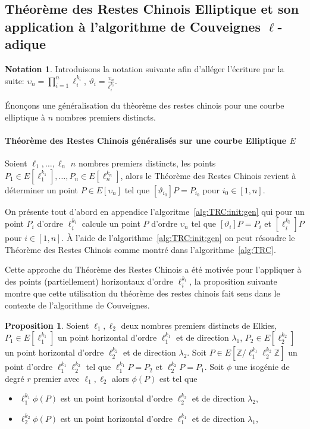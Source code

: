 \documentclass[10pt,a4paper]{book}
\theoremstyle{plain}
\theoremstyle{definition}
\theoremstyle{definition}
\theoremstyle{definition}
\newtheorem{prop}[thm]{Proposition}
\theoremstyle{definition}
\theoremstyle{remark}
\theoremstyle{remark}
\theoremstyle{definition}
\newtheorem{nota}[thm]{Notation}
\begin{document}
\subsection{Théorème des Restes Chinois Elliptique et son application à l'algorithme de Couveignes $\ell$-adique}
\label{sub:TRCE:cou}


\begin{nota}
Introduisons la notation suivante afin d'alléger l'écriture par la suite: 
$\upsilon_n=\prod_{i=1}^n \ell_i^{k_i}$, 
$\vartheta_i=\frac{\upsilon_n}{\ell_i^{k_i}}$.
\end{nota}

\'Enonçons une généralisation du thèorème des restes chinois pour une courbe 
elliptique à $n$ nombres premiers distincts.

\paragraph{Théorème des Restes Chinois généralisés sur une courbe Elliptique $E$}
Soient $\ell_1, \dots, \ell_n$ $n$ nombres premiers distincts, les points $P_1 \in E[\ell_1^{k_1}], \dots, P_n \in E[\ell_n^{k_n}]$, alors le Théorème des Restes Chinois revient à déterminer un point $P \in E[\upsilon_n]$ tel que $[\vartheta_{i_0}] P=P_{i_0}$ pour $i_0 \in [1,n]$.

On présente tout d'abord en appendice l'algoritme~\ref{alg:TRC:init:gen} qui 
pour un point $P_{i}$ d'ordre $\ell_{i}^{k_{i}}$ calcule un point $P$ d'ordre 
$\upsilon_n$ tel que $[\vartheta_{i}]P=P_{i}$ et $[\ell_{i}^{k_{i}}]P$ pour 
$i \in [1,n]$. \`A l'aide de l'algorithme~\ref{alg:TRC:init:gen} on peut résoudre le 
Théorème des Restes Chinois comme montré dans l'algorithme~\ref{alg:TRC}.

Cette approche du Théorème des Restes Chinois a été motivée pour l'appliquer à 
des points (partiellement) horizontaux d'ordre $\ell_i^{k_i}$, la proposition 
suivante montre que cette utilisation du théorème des restes chinois fait sens 
dans le contexte de l'algorithme de Couveignes.

\begin{prop}
\label{pro:par:TRC}
Soient $\ell_1, \ell_2$ deux nombres premiers distincts de Elkies, 
$P_1 \in E[\ell_1^{k_1}]$ un point horizontal d'ordre 
$\ell_1^{k_1}$ et de direction $\lambda_1$, $P_2 \in E[\ell_2^{k_2}]$ un point 
horizontal d'ordre $\ell_2^{k_2}$ et de direction $\lambda_2$. Soit $P \in 
E[\mathbb{Z}/\ell_1^{k_1}\ell_2^{k_2}\mathbb{Z}]$ un point d'ordre 
$\ell_1^{k_1}\ell_2^{k_2}$ tel que $\ell_1^{k_1}P=P_2$ et $\ell_2^{k_2}P=P_1$.
Soit $\phi$ une isogénie de degré $r$ premier avec $\ell_1, \ell_2$ alors 
$\phi(P)$ est tel que
\begin{itemize}
\item $\ell_1^{k_1}\phi(P)$ est un point horizontal d'ordre 
$\ell_2^{k_2}$ et de direction $\lambda_2$,  
\item $\ell_2^{k_2}\phi(P)$ est un point horizontal d'ordre 
$\ell_1^{k_1}$ et de direction $\lambda_1$,
\end{itemize}
\end{prop}
\end{document}
